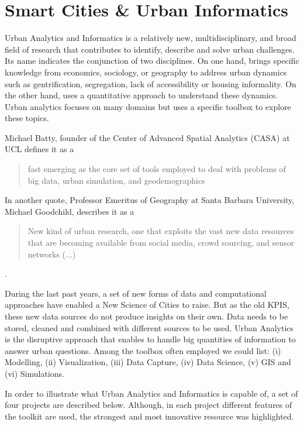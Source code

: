 \section{Smart Cities \& Urban Informatics}
Urban Analytics and Informatics is a relatively new, multidisciplinary, and broad field of research that contributes to identify, describe and solve urban challenges. Its name indicates the conjunction of two disciplines. On one hand, brings specific knowledge from economics, sociology, or geography to address urban dynamics such as gentrification, segregation, lack of accessibility or housing informality. On the other hand, uses a quantitative approach to understand these dynamics. Urban analytics focuses on many domains but uses a specific toolbox to explore these topics. \par
Michael Batty, founder of the Center of Advanced Spatial Analytics (CASA) at UCL defines it as a 
\begin{quote}
    fast emerging as the core set of tools employed to deal with problems of big data, urban simulation, and geodemographics
\end{quote}
In another quote, Professor Emeritus of Geography at Santa Barbara University, Michael Goodchild, describes it as a 
\begin{quote}
New kind of urban research, one that exploits the vast new data resources that are becoming available from social media, crowd sourcing, and sensor networks (...)
\end{quote}
\cite{singletonUrbanAnalytics2018}. \par

During the last past years, a set of new forms of data and computational approaches have enabled a New Science of Cities to raise. But as the old KPIS, these new data sources do not produce insights on their own. Data needs to be stored, cleaned and combined with different sources to be used. Urban Analytics is the disruptive approach that enables to handle big quantities of information to answer urban questions. Among the toolbox often employed we could list: (i) Modelling, (ii) Visualization, (iii) Data Capture, (iv) Data Science, (v) GIS and (vi) Simulations. \par

In order to illustrate what Urban Analytics and Informatics is capable of, a set of four projects are described below. Although, in each project different features of the toolkit are used, the strongest and most innovative resource was highlighted. 


